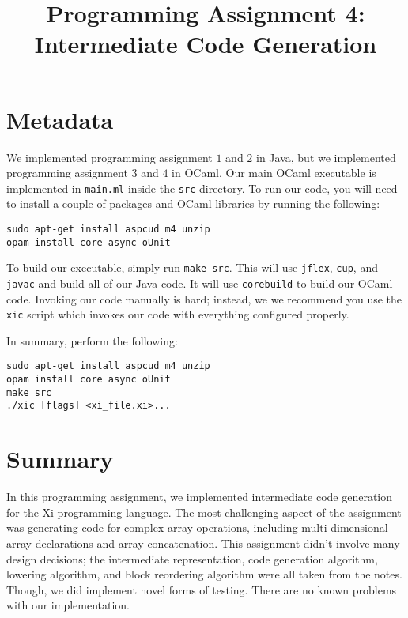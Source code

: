 \documentclass{hw}
\title{Programming Assignment 4:\\ Intermediate Code Generation}
\begin{document}
\maketitle

\section{Metadata}\label{sec:metadata}
We implemented programming assignment $1$ and $2$ in Java, but we implemented
programming assignment $3$ and $4$ in OCaml. Our main OCaml executable is
implemented in \texttt{main.ml} inside the \texttt{src} directory. To run our
code, you will need to install a couple of packages and OCaml libraries by
running the following:

\begin{center}
\begin{BVerbatim}
sudo apt-get install aspcud m4 unzip
opam install core async oUnit
\end{BVerbatim}
\end{center}

To build our executable, simply run \texttt{make src}. This will use
\texttt{jflex}, \texttt{cup}, and \texttt{javac} and build all of our Java
code. It will use \texttt{corebuild} to build our OCaml code. Invoking our
code manually is hard; instead, we we recommend you use the \texttt{xic} script
which invokes our code with everything configured properly.

In summary, perform the following:

\begin{center}
\begin{BVerbatim}
sudo apt-get install aspcud m4 unzip
opam install core async oUnit
make src
./xic [flags] <xi_file.xi>...
\end{BVerbatim}
\end{center}

\section{Summary}\label{sec:summary}
In this programming assignment, we implemented intermediate code generation for
the Xi programming language. The most challenging aspect of the assignment was
generating code for complex array operations, including multi-dimensional array
declarations and array concatenation.  This assignment didn't involve many
design decisions; the intermediate representation, code generation algorithm,
lowering algorithm, and block reordering algorithm were all taken from the
notes. Though, we did implement novel forms of testing. There are no known
problems with our implementation.
\end{document}
